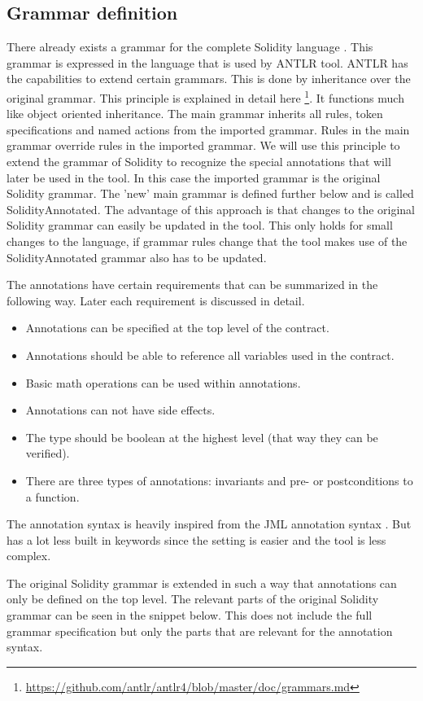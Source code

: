 \documentclass[a4paper]{article}
\begin{document}
\subsection{Grammar definition}
There already exists a grammar for the complete Solidity language \cite{antlroriginalgrammar}. This grammar is expressed in the language that is used by ANTLR tool. ANTLR has the capabilities to extend certain grammars. This is done by inheritance over the original grammar. This principle is explained in detail here \footnote{\url{https://github.com/antlr/antlr4/blob/master/doc/grammars.md}}. It functions much like object oriented inheritance. The main grammar inherits all rules, token specifications and named actions from the imported grammar. Rules in the main grammar override rules in the imported grammar. We will use this principle to extend the grammar of Solidity to recognize the special annotations that will later be used in the tool. In this case the imported grammar is the original Solidity grammar. The 'new' main grammar is defined further below and is called SolidityAnnotated. The advantage of this approach is that changes to the original Solidity grammar can easily be updated in the tool. This only holds for small changes to the language, if grammar rules change that the tool makes use of the SolidityAnnotated grammar also has to be updated.\par
The annotations have certain requirements that can be summarized in the following way. Later each requirement is discussed in detail.
\begin{itemize}
    \item Annotations can be specified at the top level of the contract.
    \item Annotations should be able to reference all variables used in the contract.
    \item Basic math operations can be used within annotations.
    \item Annotations can not have side effects.
    \item The type should be boolean at the highest level (that way they can be verified).
    \item There are three types of annotations: invariants and pre- or postconditions to a function.
\end{itemize}

The annotation syntax is heavily inspired from the JML annotation syntax \cite{leavens2008jml}. But has a lot less built in keywords since the setting is easier and the tool is less complex. \par
The original Solidity grammar is extended in such a way that annotations can only be defined on the top level. The relevant parts of the original Solidity grammar can be seen in the snippet below. This does not include the full grammar specification but only the parts that are relevant for the annotation syntax.
\end{document}
